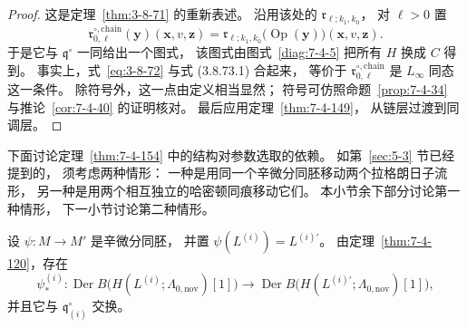 \begin{proof}
这是定理~\ref{thm:3-8-71} 的重新表述。
沿用该处的 $\mathfrak r_{\ell;k_1,k_0}$，
对 $\ell>0$ 置
\[
\mathfrak r^{\circ,\mathrm{chain}}_{0,\ell}
(\mathbf y)(\mathbf x,v,\mathbf z)
=
\mathfrak r_{\ell;k_1,k_0}
\bigl(\operatorname{Op}(\mathbf y)\bigr)
(\mathbf x,v,\mathbf z).
\]
于是它与 $\mathfrak q^\circ$ 一同给出一个图式，
该图式由图式~\ref{diag:7-4-5}
把所有 $H$ 换成 $C$ 得到。
事实上，式~\eqref{eq:3-8-72}
与式 (3.8.73.1) 合起来，
等价于
$\mathfrak r^{\circ,\mathrm{chain}}_{0,\ell}$
是 $L_\infty$ 同态这一条件。
除符号外，这一点由定义相当显然；
符号可仿照命题~\ref{prop:7-4-34}
与推论~\ref{cor:7-4-40} 的证明核对。
最后应用定理~\ref{thm:7-4-149}，
从链层过渡到同调层。
\end{proof}

下面讨论定理~\ref{thm:7-4-154}
中的结构对参数选取的依赖。
如第~\ref{sec:5-3} 节已经提到的，
须考虑两种情形：
一种是用同一个辛微分同胚移动两个拉格朗日子流形，
另一种是用两个相互独立的哈密顿同痕移动它们。
本小节余下部分讨论第一种情形，
下一小节讨论第二种情形。

设
$\psi\colon M\to M'$ 是辛微分同胚，
并置
$\psi(L^{(i)})=L^{(i)\prime}$。
由定理~\ref{thm:7-4-120}，存在
\begin{equation}
\psi_*^{(i)}\colon
\operatorname{Der}B
\bigl(H(L^{(i)};\Lambda_{0,\mathrm{nov}})[1]\bigr)
\longrightarrow
\operatorname{Der}B
\bigl(H(L^{(i)\prime};\Lambda_{0,\mathrm{nov}})[1]\bigr),
\tag{7.4.155}\label{eq:7-4-155}
\end{equation}
并且它与 $\mathfrak q^\circ_{(i)}$ 交换。

